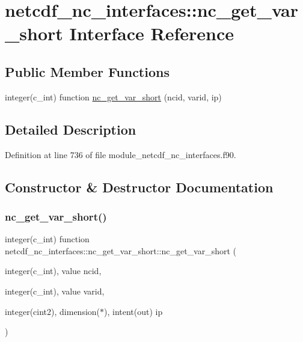 \hypertarget{interfacenetcdf__nc__interfaces_1_1nc__get__var__short}{}\section{netcdf\+\_\+nc\+\_\+interfaces\+:\+:nc\+\_\+get\+\_\+var\+\_\+short Interface Reference}
\label{interfacenetcdf__nc__interfaces_1_1nc__get__var__short}
\subsection*{Public Member Functions}
\begin{DoxyCompactItemize}
\item 
integer(c\+\_\+int) function \hyperlink{interfacenetcdf__nc__interfaces_1_1nc__get__var__short_adc56b1e386d91eff6226a39808d5f977}{nc\+\_\+get\+\_\+var\+\_\+short} (ncid, varid, ip)
\end{DoxyCompactItemize}


\subsection{Detailed Description}


Definition at line 736 of file module\+\_\+netcdf\+\_\+nc\+\_\+interfaces.\+f90.



\subsection{Constructor \& Destructor Documentation}
\mbox{\label{interfacenetcdf__nc__interfaces_1_1nc__get__var__short_adc56b1e386d91eff6226a39808d5f977}} 
\subsubsection{\texorpdfstring{nc\+\_\+get\+\_\+var\+\_\+short()}{nc\_get\_var\_short()}}
{\footnotesize\ttfamily integer(c\+\_\+int) function netcdf\+\_\+nc\+\_\+interfaces\+::nc\+\_\+get\+\_\+var\+\_\+short\+::nc\+\_\+get\+\_\+var\+\_\+short (\begin{DoxyParamCaption}\item[{integer(c\+\_\+int), value}]{ncid,  }\item[{integer(c\+\_\+int), value}]{varid,  }\item[{integer(cint2), dimension($\ast$), intent(out)}]{ip }\end{DoxyParamCaption})}



